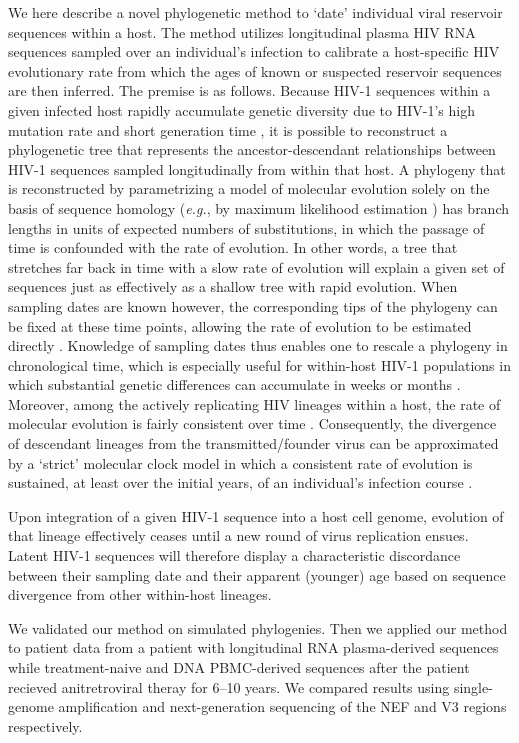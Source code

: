\documentclass[9pt,twocolumn,twoside,lineno]{pnas-new}
\begin{document}
We here describe a novel phylogenetic method to `date' individual viral reservoir sequences within a host.
The method utilizes longitudinal plasma HIV RNA sequences sampled over an individual's infection to calibrate a host-specific HIV evolutionary rate from which the ages of known or suspected reservoir sequences are then inferred. The premise is as follows.
Because HIV-1 sequences within a given infected host rapidly accumulate genetic diversity due to HIV-1's high mutation rate and short generation time \cite{Alizon13,Rambaut04,Shankarappa99}, it is possible to reconstruct a phylogenetic tree that represents the ancestor-descendant relationships between HIV-1 sequences sampled longitudinally from within that host.
A phylogeny that is reconstructed by parametrizing a model of molecular evolution solely on the basis of sequence homology (\emph{e.g.}, by maximum likelihood estimation \cite{Felsenstein81}) has branch lengths in units of expected numbers of substitutions, in which the passage of time is confounded with the rate of evolution.
In other words, a tree that stretches far back in time with a slow rate of evolution will explain a given set of sequences just as effectively as a shallow tree with rapid evolution.
When sampling dates are known however, the corresponding tips of the phylogeny can be fixed at these time points, allowing the rate of evolution to be estimated directly \cite{Rodrigo99}.
Knowledge of sampling dates thus enables one to rescale a phylogeny in chronological time, which is especially useful for within-host HIV-1 populations in which substantial genetic differences can accumulate in weeks or months \cite{Williamson03}.
Moreover, among the actively replicating HIV lineages within a host, the rate of molecular evolution is fairly consistent over time \cite{Korber00,Kuhner95,Leitner99,Park16}.
Consequently, the divergence of descendant lineages from the transmitted/founder virus can be approximated by a `strict' molecular clock model in which a consistent rate of evolution is sustained, at least over the initial years, of an individual's infection course \cite{Keele08}. 

Upon integration of a given HIV-1 sequence into a host cell genome, evolution of that lineage effectively ceases until a new round of virus replication ensues.
Latent HIV-1 sequences will therefore display a characteristic discordance between their sampling date and their apparent (younger) age based on sequence divergence from other within-host lineages.

We validated our method on simulated phylogenies.
Then we applied our method to patient data from a patient with longitudinal RNA plasma-derived sequences while treatment-naive and DNA PBMC-derived sequences after the patient recieved anitretroviral theray for 6--10 years.
We compared results using single-genome amplification and next-generation sequencing of the NEF and V3 regions respectively.
\end{document}
